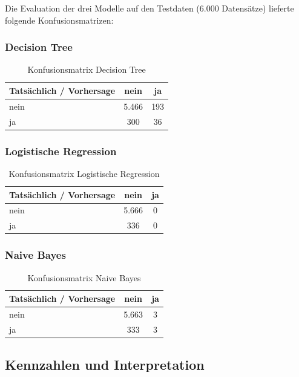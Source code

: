 Die Evaluation der drei Modelle auf den Testdaten (6.000 Datensätze) lieferte 
folgende Konfusionsmatrizen:

\subsubsection{Decision Tree}
\begin{table}[H]
\centering
\begin{tabular}{l|cc}
\textbf{Tatsächlich / Vorhersage} & \textbf{nein} & \textbf{ja} \\
\hline
nein & 5.466 & 193 \\
ja & 300 & 36 \\
\end{tabular}
\caption{Konfusionsmatrix Decision Tree}
\end{table}

\subsubsection{Logistische Regression}
\begin{table}[h]
\centering
\begin{tabular}{l|cc}
\textbf{Tatsächlich / Vorhersage} & \textbf{nein} & \textbf{ja} \\
\hline
nein & 5.666 & 0 \\
ja & 336 & 0 \\
\end{tabular}
\caption{Konfusionsmatrix Logistische Regression}
\end{table}

\subsubsection{Naive Bayes}
\begin{table}[h]
\centering
\begin{tabular}{l|cc}
\textbf{Tatsächlich / Vorhersage} & \textbf{nein} & \textbf{ja} \\
\hline
nein & 5.663 & 3 \\
ja & 333 & 3 \\
\end{tabular}
\caption{Konfusionsmatrix Naive Bayes}
\end{table}

\subsection{Kennzahlen und Interpretation}

